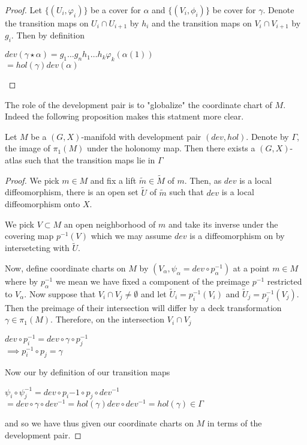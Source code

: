 \begin{proof}
    Let $\{(U_i, \varphi_i)\}$ be a cover for $\alpha$ and $\{(V_i, \phi_i)\}$ be
    cover for $\gamma$. Denote the transition maps on $U_i \cap U_{i+1}$ by $h_i$
    and the transition maps on $V_i \cap V_{i+1}$ by $g_i$. Then by definition
    \begin{center}
        $dev(\gamma \star \alpha) = g_1 \dots g_n h_1 \dots h_k \varphi_k(\alpha(1))$\\
        $= hol(\gamma)dev(\alpha)$
    \end{center}
\end{proof}

The role of the development pair is to "globalize" the coordinate chart of $M$.
Indeed the following proposition makes this statment more clear.

\begin{prop}
    Let $M$ be a $(G,X)$-manifold with development pair $(dev, hol)$. Denote
    by $\Gamma$, the image of $\pi_1(M)$ under the holonomy map. Then there
    exists a $(G,X)$-atlas such that the transition maps lie in $\Gamma$
\end{prop}

\begin{proof}
    We pick $m\in M$ and fix a lift $\tilde{m}\in \tilde{M}$ of $m$. Then, as
    $dev$ is a local diffeomorphism, there is an open set $\tilde{U}$ of $\tilde{m}$
    such that $dev$ is a local diffeomorphism onto $X$.

    We pick $V \subset M$ an open neighborhood of $m$ and take its inverse under
    the covering map $p^{-1}(V)$ which we may assume $dev$ is a diffeomorphism on
    by intersetcting with $\tilde{U}$.

    Now, define coordinate charts on $M$ by $(V_{\alpha}, \psi_{\alpha} = dev \circ
        p^{-1}_{\alpha})$ at a point $m \in M$ where by $p^{-1}_{\alpha}$ we mean we
    have fixed a component of the preimage $p^{-1}$ restricted to $V_{\alpha}$. Now
    suppose that $V_i \cap V_j \neq \emptyset$ and let $\tilde{U}_i =
        p_i^{-1}(V_i)$ and $\tilde{U}_j = p_j^{-1}(V_j)$. Then the preimage of their
    intersection will differ by a deck transformation $\gamma \in \pi_1(M)$.
    Therefore, on the intersection $V_i \cap V_j$
    \begin{center}
        $dev \circ p_i^{-1} = dev \circ \gamma \circ p_j^{-1}$\\
        $\implies p^{-1}_i \circ p_j = \gamma$
    \end{center}

    Now our by definition of our transition maps
    \begin{center}
        $\psi_i \circ \psi_j^{-1} = dev \circ p_i{-1} \circ p_j \circ dev^{-1}$\\
        $= dev \circ \gamma \circ dev^{-1} = hol(\gamma)dev\circ dev^{-1} = hol(\gamma) \in \Gamma$
    \end{center}

    and so we have thus given our coordinate charts on $M$ in terms of the
    development pair.
\end{proof}

